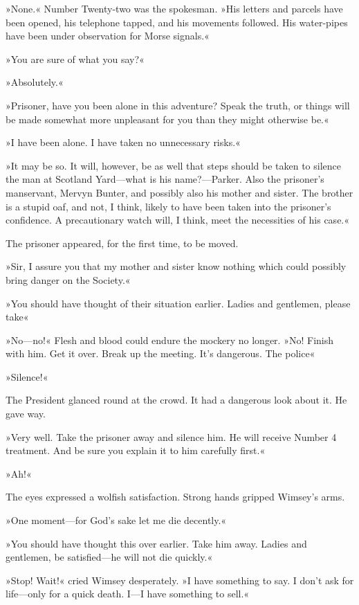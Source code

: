 »None.« Number Twenty-two was the spokesman. »His letters and parcels have been opened, his telephone tapped, and his movements followed. His water-pipes have been under observation for Morse signals.«

»You are sure of what you say?«

»Absolutely.«

»Prisoner, have you been alone in this adventure? Speak the truth, or things will be made somewhat more unpleasant for you than they might otherwise be.«

»I have been alone. I have taken no unnecessary risks.«

»It may be so. It will, however, be as well that steps should be taken to silence the man at Scotland Yard—what is his name?—Parker. Also the prisoner's manservant, Mervyn Bunter, and possibly also his mother and sister. The brother is a stupid oaf, and not, I think, likely to have been taken into the prisoner's confidence. A precautionary watch will, I think, meet the necessities of his case.«

The prisoner appeared, for the first time, to be moved.

»Sir, I assure you that my mother and sister know nothing which could possibly bring danger on the Society.«

»You should have thought of their situation earlier. Ladies and gentlemen, please take\longdash«

»No—no!« Flesh and blood could endure the mockery no longer. »No! Finish with him. Get it over. Break up the meeting. It's dangerous. The police\longdash«

»Silence!«

The President glanced round at the crowd. It had a dangerous look about it. He gave way.

»Very well. Take the prisoner away and silence him. He will receive Number 4 treatment. And be sure you explain it to him carefully first.«

»Ah!«

The eyes expressed a wolfish satisfaction. Strong hands gripped Wimsey's arms.

»One moment—for God's sake let me die decently.«

»You should have thought this over earlier. Take him away. Ladies and gentlemen, be satisfied—he will not die quickly.«

»Stop! Wait!« cried Wimsey desperately. »I have something to say. I don't ask for life—only for a quick death. I—I have something to sell.«

